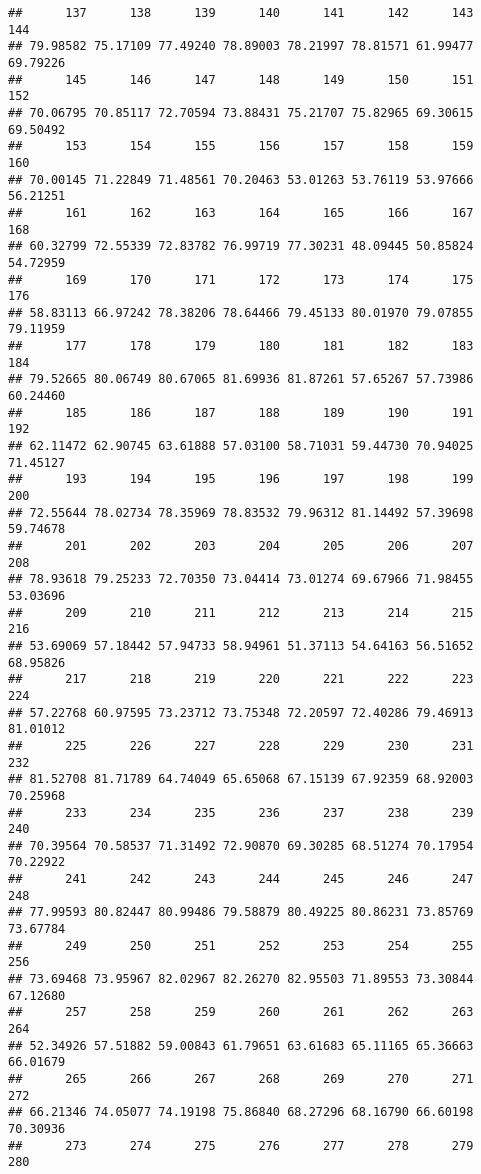 \documentclass[
]{article}
\begin{document}
\begin{verbatim}
##      137      138      139      140      141      142      143      144 
## 79.98582 75.17109 77.49240 78.89003 78.21997 78.81571 61.99477 69.79226 
##      145      146      147      148      149      150      151      152 
## 70.06795 70.85117 72.70594 73.88431 75.21707 75.82965 69.30615 69.50492 
##      153      154      155      156      157      158      159      160 
## 70.00145 71.22849 71.48561 70.20463 53.01263 53.76119 53.97666 56.21251 
##      161      162      163      164      165      166      167      168 
## 60.32799 72.55339 72.83782 76.99719 77.30231 48.09445 50.85824 54.72959 
##      169      170      171      172      173      174      175      176 
## 58.83113 66.97242 78.38206 78.64466 79.45133 80.01970 79.07855 79.11959 
##      177      178      179      180      181      182      183      184 
## 79.52665 80.06749 80.67065 81.69936 81.87261 57.65267 57.73986 60.24460 
##      185      186      187      188      189      190      191      192 
## 62.11472 62.90745 63.61888 57.03100 58.71031 59.44730 70.94025 71.45127 
##      193      194      195      196      197      198      199      200 
## 72.55644 78.02734 78.35969 78.83532 79.96312 81.14492 57.39698 59.74678 
##      201      202      203      204      205      206      207      208 
## 78.93618 79.25233 72.70350 73.04414 73.01274 69.67966 71.98455 53.03696 
##      209      210      211      212      213      214      215      216 
## 53.69069 57.18442 57.94733 58.94961 51.37113 54.64163 56.51652 68.95826 
##      217      218      219      220      221      222      223      224 
## 57.22768 60.97595 73.23712 73.75348 72.20597 72.40286 79.46913 81.01012 
##      225      226      227      228      229      230      231      232 
## 81.52708 81.71789 64.74049 65.65068 67.15139 67.92359 68.92003 70.25968 
##      233      234      235      236      237      238      239      240 
## 70.39564 70.58537 71.31492 72.90870 69.30285 68.51274 70.17954 70.22922 
##      241      242      243      244      245      246      247      248 
## 77.99593 80.82447 80.99486 79.58879 80.49225 80.86231 73.85769 73.67784 
##      249      250      251      252      253      254      255      256 
## 73.69468 73.95967 82.02967 82.26270 82.95503 71.89553 73.30844 67.12680 
##      257      258      259      260      261      262      263      264 
## 52.34926 57.51882 59.00843 61.79651 63.61683 65.11165 65.36663 66.01679 
##      265      266      267      268      269      270      271      272 
## 66.21346 74.05077 74.19198 75.86840 68.27296 68.16790 66.60198 70.30936 
##      273      274      275      276      277      278      279      280 

\end{verbatim}
\end{document}
